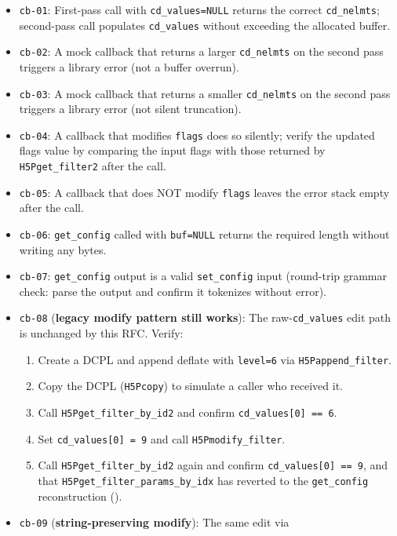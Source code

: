\documentclass[../RFC-HDFG-2026-001.tex]{subfiles}
\begin{document}
\begin{itemize}
\item \texttt{cb-01}: First-pass call with \texttt{cd\_values=NULL} returns the correct
  \texttt{cd\_nelmts}; second-pass call populates \texttt{cd\_values} without exceeding
  the allocated buffer.
\item \texttt{cb-02}: A mock callback that returns a larger \texttt{cd\_nelmts} on the
  second pass triggers a library error (not a buffer overrun).
\item \texttt{cb-03}: A mock callback that returns a smaller \texttt{cd\_nelmts} on the
  second pass triggers a library error (not silent truncation).
\item \texttt{cb-04}: A callback that modifies \texttt{flags} does so silently;
  verify the updated flags value by comparing the input flags with those
  returned by \texttt{H5Pget\_filter2} after the call.
\item \texttt{cb-05}: A callback that does NOT modify \texttt{flags} leaves the
  error stack empty after the call.
\item \texttt{cb-06}: \texttt{get\_config} called with \texttt{buf=NULL} returns the required
  length without writing any bytes.
\item \texttt{cb-07}: \texttt{get\_config} output is a valid \texttt{set\_config} input (round-trip
  grammar check: parse the output and confirm it tokenizes without error).
\item \texttt{cb-08} (\textbf{legacy modify pattern still works}): The
  raw-\texttt{cd\_values} edit path is unchanged by this RFC.  Verify:
  \begin{enumerate}
    \item Create a DCPL and append deflate with \texttt{level=6} via
          \texttt{H5Pappend\_filter}.
    \item Copy the DCPL (\texttt{H5Pcopy}) to simulate a caller who received it.
    \item Call \texttt{H5Pget\_filter\_by\_id2} and confirm \texttt{cd\_values[0] == 6}.
    \item Set \texttt{cd\_values[0] = 9} and call \texttt{H5Pmodify\_filter}.
    \item Call \texttt{H5Pget\_filter\_by\_id2} again and confirm \texttt{cd\_values[0] == 9},
          and that \texttt{H5Pget\_filter\_params\_by\_idx} has reverted to the
          \texttt{get\_config} reconstruction ().
  \end{enumerate}
\item \texttt{cb-09} (\textbf{string-preserving modify}): The same edit via

\end{itemize}
\end{document}
